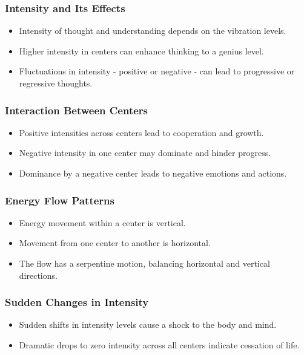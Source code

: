 \begin{frame}[fragile]\frametitle{Intensity and Its Effects}
    \begin{itemize}
        \item Intensity of thought and understanding depends on the vibration levels.
        \item Higher intensity in centers can enhance thinking to a genius level.
        \item Fluctuations in intensity - positive or negative - can lead to progressive or regressive thoughts.
    \end{itemize}
\end{frame}

\begin{frame}[fragile]\frametitle{Interaction Between Centers}
    \begin{itemize}
        \item Positive intensities across centers lead to cooperation and growth.
        \item Negative intensity in one center may dominate and hinder progress.
        \item Dominance by a negative center leads to negative emotions and actions.
    \end{itemize}
\end{frame}

\begin{frame}[fragile]\frametitle{Energy Flow Patterns}
    \begin{itemize}
        \item Energy movement within a center is vertical.
        \item Movement from one center to another is horizontal.
        \item The flow has a serpentine motion, balancing horizontal and vertical directions.
    \end{itemize}
\end{frame}

\begin{frame}[fragile]\frametitle{Sudden Changes in Intensity}
    \begin{itemize}
        \item Sudden shifts in intensity levels cause a shock to the body and mind.
        \item Dramatic drops to zero intensity across all centers indicate cessation of life.
    \end{itemize}
\end{frame}


